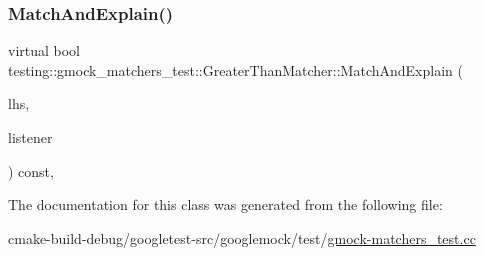 \subsubsection{\texorpdfstring{MatchAndExplain()}{MatchAndExplain()}}
{\footnotesize\ttfamily virtual bool testing\+::gmock\+\_\+matchers\+\_\+test\+::\+Greater\+Than\+Matcher\+::\+Match\+And\+Explain (\begin{DoxyParamCaption}\item[{int}]{lhs,  }\item[{Match\+Result\+Listener $\ast$}]{listener }\end{DoxyParamCaption}) const\hspace{0.3cm}{\ttfamily [inline]}, {\ttfamily [virtual]}}



The documentation for this class was generated from the following file\+:\begin{DoxyCompactItemize}
\item 
cmake-\/build-\/debug/googletest-\/src/googlemock/test/\mbox{\hyperlink{gmock-matchers__test_8cc}{gmock-\/matchers\+\_\+test.\+cc}}\end{DoxyCompactItemize}

